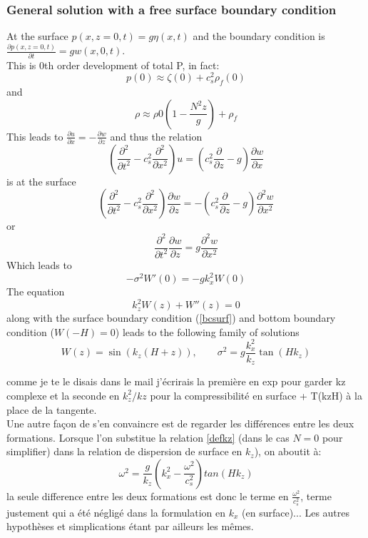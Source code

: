 \documentclass[a4paper]{article}
\numberwithin{equation}{section}
\begin{document}
\subsubsection{General solution with a free surface boundary condition}
At the surface $p(x,z=0,t)=g\eta(x,t)$
 and the boundary condition is $\displaystyle \frac{\partial p(x,z=0,t)}{\partial t}=gw(x,0,t)$.\\
 \color{blue} This is 0th order development of total P, in fact:
\[
p(0) \approx \zeta(0) +c_s^2 \rho_f(0) 
\]
and
\[
\rho \approx \rho0 \left(1-\frac{N^2 z}{g}\right)+\rho_f
\]
\color{black}
\color{black}
 This leads to $\frac{\partial u}{\partial x}=-\frac{\partial w}{\partial z}$ and thus
 the relation 
\[
\left(
\frac{\partial^2 }{\partial t^2}-c_s^2\frac{\partial^2}{\partial x^2}
\right)u
=
\left(
c_s^2\frac{\partial}{\partial z}-g
\right)\frac{\partial w}{\partial x}
\]
is at the surface
\[
\left(
\frac{\partial^2 }{\partial t^2}-c_s^2\frac{\partial^2}{\partial x^2}
\right)\frac{\partial w}{\partial z}
=
-\left(
c_s^2\frac{\partial}{\partial z}-g
\right)\frac{\partial^2 w}{\partial x^2}
\]
or
\[
\frac{\partial^2 }{\partial t^2}
\frac{\partial w}{\partial z}
=
g\frac{\partial^2 w}{\partial x^2}
\]
Which leads to
\begin{equation}
-\sigma^2 W'(0)=-gk_x^2W(0)
\label{bcsurf}
\end{equation}
The equation
\[
k_z^2W(z)+W''(z)=0
\]
along with the surface boundary condition (\ref{bcsurf}) and bottom boundary condition ($W(-H)=0$) leads to the following family of solutions
\[
W(z)=\sin (k_z (H+z)), \qquad \sigma^2=g\frac{k_x^2}{k_z}\tan(Hk_z)
\]

\color{blue} comme je te le disais dans le mail j'écrirais la première en exp pour garder kz complexe et la seconde en $k_z^2/kz$ pour la compressibilité en surface + T(kzH) à la place de la tangente.\\
Une autre façon de s'en convaincre est de regarder les différences entre les deux formations. Lorsque l'on substitue la relation \ref{defkz} (dans le cas $N=0$ pour simplifier) dans la relation de dispersion de surface en $k_z$), on aboutit à:
\[
\omega^2=\frac{g}{k_z}\left(k_x^2-\frac{\omega^2}{c_s^2}\right) tan(Hk_z)
\]
la seule difference entre les deux formations est donc le terme en $\frac{\omega^2}{c_s^2}$, terme justement qui a été négligé dans la formulation en $k_x$ (en surface)... Les autres hypothèses et simplications étant par ailleurs les mêmes.
\color{black}
\end{document}
